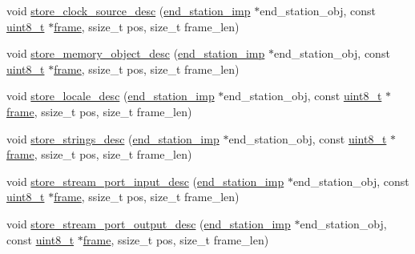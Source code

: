 \begin{DoxyCompactItemize}
\item 
void \hyperlink{classavdecc__lib_1_1configuration__descriptor__imp_a3368d96892495d87db2b4a2dc1405632}{store\+\_\+clock\+\_\+source\+\_\+desc} (\hyperlink{classavdecc__lib_1_1end__station__imp}{end\+\_\+station\+\_\+imp} $\ast$end\+\_\+station\+\_\+obj, const \hyperlink{stdint_8h_aba7bc1797add20fe3efdf37ced1182c5}{uint8\+\_\+t} $\ast$\hyperlink{gst__avb__playbin_8c_ac8e710e0b5e994c0545d75d69868c6f0}{frame}, ssize\+\_\+t pos, size\+\_\+t frame\+\_\+len)
\item 
void \hyperlink{classavdecc__lib_1_1configuration__descriptor__imp_a68ccd7a0287923e601c5c522a1288179}{store\+\_\+memory\+\_\+object\+\_\+desc} (\hyperlink{classavdecc__lib_1_1end__station__imp}{end\+\_\+station\+\_\+imp} $\ast$end\+\_\+station\+\_\+obj, const \hyperlink{stdint_8h_aba7bc1797add20fe3efdf37ced1182c5}{uint8\+\_\+t} $\ast$\hyperlink{gst__avb__playbin_8c_ac8e710e0b5e994c0545d75d69868c6f0}{frame}, ssize\+\_\+t pos, size\+\_\+t frame\+\_\+len)
\item 
void \hyperlink{classavdecc__lib_1_1configuration__descriptor__imp_a7b7b25bcd5ee45166b328935ee93abb3}{store\+\_\+locale\+\_\+desc} (\hyperlink{classavdecc__lib_1_1end__station__imp}{end\+\_\+station\+\_\+imp} $\ast$end\+\_\+station\+\_\+obj, const \hyperlink{stdint_8h_aba7bc1797add20fe3efdf37ced1182c5}{uint8\+\_\+t} $\ast$\hyperlink{gst__avb__playbin_8c_ac8e710e0b5e994c0545d75d69868c6f0}{frame}, ssize\+\_\+t pos, size\+\_\+t frame\+\_\+len)
\item 
void \hyperlink{classavdecc__lib_1_1configuration__descriptor__imp_ae90f0aff32857e69a0225f7ab245929b}{store\+\_\+strings\+\_\+desc} (\hyperlink{classavdecc__lib_1_1end__station__imp}{end\+\_\+station\+\_\+imp} $\ast$end\+\_\+station\+\_\+obj, const \hyperlink{stdint_8h_aba7bc1797add20fe3efdf37ced1182c5}{uint8\+\_\+t} $\ast$\hyperlink{gst__avb__playbin_8c_ac8e710e0b5e994c0545d75d69868c6f0}{frame}, ssize\+\_\+t pos, size\+\_\+t frame\+\_\+len)
\item 
void \hyperlink{classavdecc__lib_1_1configuration__descriptor__imp_ada30d6f6d34a41b39a9d222a5fde5bcb}{store\+\_\+stream\+\_\+port\+\_\+input\+\_\+desc} (\hyperlink{classavdecc__lib_1_1end__station__imp}{end\+\_\+station\+\_\+imp} $\ast$end\+\_\+station\+\_\+obj, const \hyperlink{stdint_8h_aba7bc1797add20fe3efdf37ced1182c5}{uint8\+\_\+t} $\ast$\hyperlink{gst__avb__playbin_8c_ac8e710e0b5e994c0545d75d69868c6f0}{frame}, ssize\+\_\+t pos, size\+\_\+t frame\+\_\+len)
\item 
void \hyperlink{classavdecc__lib_1_1configuration__descriptor__imp_a6de6493b7555ec22eb920e5a1eff6347}{store\+\_\+stream\+\_\+port\+\_\+output\+\_\+desc} (\hyperlink{classavdecc__lib_1_1end__station__imp}{end\+\_\+station\+\_\+imp} $\ast$end\+\_\+station\+\_\+obj, const \hyperlink{stdint_8h_aba7bc1797add20fe3efdf37ced1182c5}{uint8\+\_\+t} $\ast$\hyperlink{gst__avb__playbin_8c_ac8e710e0b5e994c0545d75d69868c6f0}{frame}, ssize\+\_\+t pos, size\+\_\+t frame\+\_\+len)

\end{DoxyCompactItemize}
